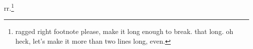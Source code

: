 \documentclass{ltugboat}
\begin{document}
rr.\footnote{\tubraggedfoot ragged right footnote please, make it long
enough to break. that long. oh heck, let's make it more than two lines
long, even.}
\end{document}
